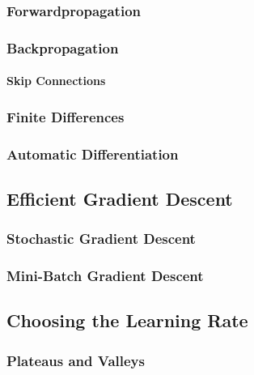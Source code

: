 			\subsubsection{Forwardpropagation} %

			\subsubsection{Backpropagation} %

				\paragraph{Skip Connections} %

			\subsubsection{Finite Differences} %

			\subsubsection{Automatic Differentiation} %

		\subsection{Efficient Gradient Descent} %

			\subsubsection{Stochastic Gradient Descent} %

			\subsubsection{Mini-Batch Gradient Descent} %

		\subsection{Choosing the Learning Rate} %

			\subsubsection{Plateaus and Valleys} %

